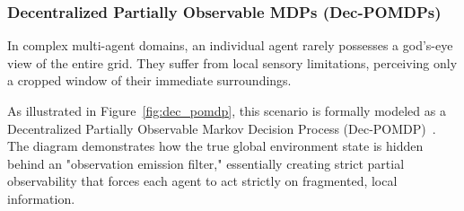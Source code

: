\subsubsection{Decentralized Partially Observable MDPs (Dec-POMDPs)}
\label{subsec:dec_pomdp}

In complex multi-agent domains, an individual agent rarely possesses a god's-eye view of the entire grid. They suffer from local sensory limitations, perceiving only a cropped window of their immediate surroundings. 

As illustrated in Figure~\ref{fig:dec_pomdp}, this scenario is formally modeled as a Decentralized Partially Observable Markov Decision Process (Dec-POMDP)~\parencite{Oliehoek_Amato_2016}. The diagram demonstrates how the true global environment state is hidden behind an "observation emission filter," essentially creating strict partial observability that forces each agent to act strictly on fragmented, local information.

